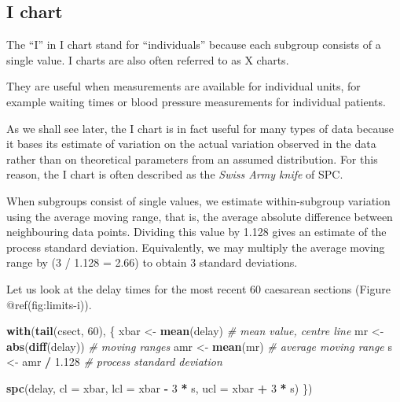 \documentclass[
]{book}
\newenvironment{Shaded}{\begin{snugshade}}{\end{snugshade}}
\newcommand{\AttributeTok}[1]{\textcolor[rgb]{0.13,0.29,0.53}{#1}}
\newcommand{\CommentTok}[1]{\textcolor[rgb]{0.56,0.35,0.01}{\textit{#1}}}
\newcommand{\DecValTok}[1]{\textcolor[rgb]{0.00,0.00,0.81}{#1}}
\newcommand{\FloatTok}[1]{\textcolor[rgb]{0.00,0.00,0.81}{#1}}
\newcommand{\FunctionTok}[1]{\textcolor[rgb]{0.13,0.29,0.53}{\textbf{#1}}}
\newcommand{\NormalTok}[1]{#1}
\newcommand{\OtherTok}[1]{\textcolor[rgb]{0.56,0.35,0.01}{#1}}
\newcommand{\SpecialCharTok}[1]{\textcolor[rgb]{0.81,0.36,0.00}{\textbf{#1}}}
\begin{document}
\subsection{I chart}\label{i-chart}

The ``I'' in I chart stand for ``individuals'' because each subgroup
consists of a single value. I charts are also often referred to as X
charts.

They are useful when measurements are available for individual units,
for example waiting times or blood pressure measurements for individual
patients.

As we shall see later, the I chart is in fact useful for many types of
data because it bases its estimate of variation on the actual variation
observed in the data rather than on theoretical parameters from an
assumed distribution. For this reason, the I chart is often described as
the \emph{Swiss Army knife} of SPC.

When subgroups consist of single values, we estimate within-subgroup
variation using the average moving range, that is, the average absolute
difference between neighbouring data points. Dividing this value by
1.128 gives an estimate of the process standard deviation. Equivalently,
we may multiply the average moving range by (3 / 1.128 = 2.66) to obtain
3 standard deviations.

Let us look at the delay times for the most recent 60 caesarean sections
(Figure @ref(fig:limits-i)).

\begin{Shaded}
\begin{Highlighting}[]
\FunctionTok{with}\NormalTok{(}\FunctionTok{tail}\NormalTok{(csect, }\DecValTok{60}\NormalTok{), \{}
\NormalTok{  xbar }\OtherTok{\textless{}{-}} \FunctionTok{mean}\NormalTok{(delay)      }\CommentTok{\# mean value, centre line}
\NormalTok{  mr   }\OtherTok{\textless{}{-}} \FunctionTok{abs}\NormalTok{(}\FunctionTok{diff}\NormalTok{(delay)) }\CommentTok{\# moving ranges}
\NormalTok{  amr  }\OtherTok{\textless{}{-}} \FunctionTok{mean}\NormalTok{(mr)         }\CommentTok{\# average moving range}
\NormalTok{  s    }\OtherTok{\textless{}{-}}\NormalTok{ amr }\SpecialCharTok{/} \FloatTok{1.128}      \CommentTok{\# process standard deviation}
  
  \FunctionTok{spc}\NormalTok{(delay,}
      \AttributeTok{cl  =}\NormalTok{ xbar,}
      \AttributeTok{lcl =}\NormalTok{ xbar }\SpecialCharTok{{-}} \DecValTok{3} \SpecialCharTok{*}\NormalTok{ s,}
      \AttributeTok{ucl =}\NormalTok{ xbar }\SpecialCharTok{+} \DecValTok{3} \SpecialCharTok{*}\NormalTok{ s)}
\NormalTok{\})}
\end{Highlighting}
\end{Shaded}
\end{document}
